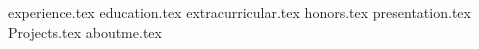 \documentclass[11pt, a4paper]{awesome-cv}
\newcommand*{\sectiondir}{resume/}
\begin{document}
\makecvheader

{experience.tex}
{education.tex}
{extracurricular.tex}
{honors.tex}
{presentation.tex}
{Projects.tex}
{aboutme.tex}
\end{document}
